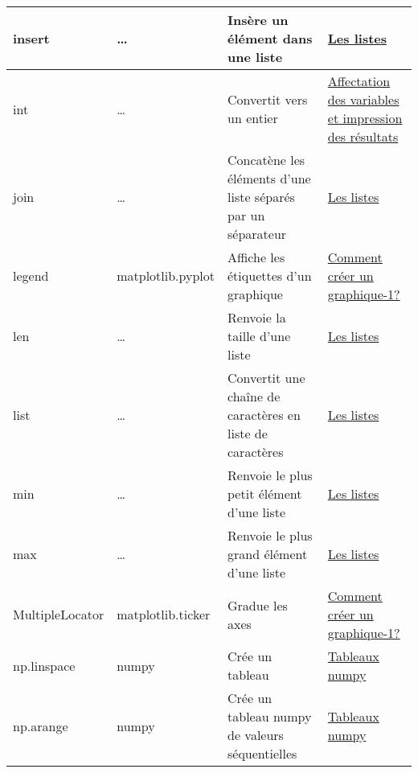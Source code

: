 \begin{longtable}{@{\extracolsep{\fill}}|p{} | p{} |p{} | p{}|@{}}
insert
 & 
\ldots{}
 & 
Insère un élément dans une liste
 & 
\href{https://pyspc.readthedocs.io/fr/latest/05-bases/07-listes.html}{Les
listes}
\\ \hline

int
 & 
\ldots{}
 & 
Convertit vers un entier
 & 
\href{https://pyspc.readthedocs.io/fr/latest/05-bases/02-variables_input_print.html}{Affectation
des variables et impression des résultats}
\\ \hline

join
 & 
\ldots{}
 & 
Concatène les éléments d'une liste séparés par un séparateur
 & 
\href{https://pyspc.readthedocs.io/fr/latest/05-bases/07-listes.html}{Les
listes}
\\ \hline

legend
 & 
matplotlib.pyplot
 & 
Affiche les étiquettes d'un graphique
 & 
\href{https://pyspc.readthedocs.io/fr/latest/05-bases/10-graphiques_partie_1.html}{Comment
créer un graphique-1?}
\\ \hline

len
 & 
\ldots{}
 & 
Renvoie la taille d'une liste
 & 
\href{https://pyspc.readthedocs.io/fr/latest/05-bases/07-listes.html}{Les
listes}
\\ \hline


list
 & 
\ldots{}
 & 
Convertit une chaîne de caractères en liste de caractères
 & 
\href{https://pyspc.readthedocs.io/fr/latest/05-bases/07-listes.html}{Les
listes}
\\ \hline

min
 & 
\ldots{}
 & 
Renvoie le plus petit élément d'une liste
 & 
\href{https://pyspc.readthedocs.io/fr/latest/05-bases/07-listes.html}{Les
listes}
\\ \hline

max
 & 
\ldots{}
 & 
Renvoie le plus grand élément d'une liste
 & 
\href{https://pyspc.readthedocs.io/fr/latest/05-bases/07-listes.html}{Les
listes}
\\ \hline

MultipleLocator
 & 
matplotlib.ticker
 & 
Gradue les axes
 & 
\href{https://pyspc.readthedocs.io/fr/latest/05-bases/10-graphiques_partie_1.html}{Comment
créer un graphique-1?}
\\ \hline

np.linspace
 & 
numpy
 & 
Crée un tableau
 & 
\href{https://pyspc.readthedocs.io/fr/latest/05-bases/08-tableaux_numpy.html}{Tableaux numpy}
\\ \hline


np.arange
 &
 numpy
 & 
 Crée un tableau numpy de valeurs séquentielles
 & 
\href{https://pyspc.readthedocs.io/fr/latest/05-bases/08-tableaux_numpy.html}{Tableaux numpy}
\\ \hline



\end{longtable}

